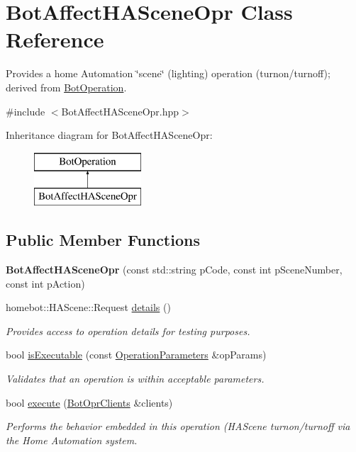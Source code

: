 \hypertarget{classBotAffectHASceneOpr}{\section{Bot\-Affect\-H\-A\-Scene\-Opr Class Reference}
\label{classBotAffectHASceneOpr}
}


Provides a home Automation \char`\"{}scene\char`\"{} (lighting) operation (turnon/turnoff); derived from \hyperlink{classBotOperation}{Bot\-Operation}.  




{\ttfamily \#include $<$Bot\-Affect\-H\-A\-Scene\-Opr.\-hpp$>$}

Inheritance diagram for Bot\-Affect\-H\-A\-Scene\-Opr\-:\begin{figure}[H]
\begin{center}
\leavevmode
\includegraphics[height=2.000000cm]{classBotAffectHASceneOpr}
\end{center}
\end{figure}
\subsection*{Public Member Functions}
\begin{DoxyCompactItemize}
\item 
\hypertarget{classBotAffectHASceneOpr_a7b924f64c28de823aae0591ac9b0d6ff}{{\bfseries Bot\-Affect\-H\-A\-Scene\-Opr} (const std\-::string p\-Code, const int p\-Scene\-Number, const int p\-Action)}\label{classBotAffectHASceneOpr_a7b924f64c28de823aae0591ac9b0d6ff}

\item 
homebot\-::\-H\-A\-Scene\-::\-Request \hyperlink{classBotAffectHASceneOpr_a78d554b4969e6d1f64cd5b812662153b}{details} ()
\begin{DoxyCompactList}\small\item\em Provides access to operation details for testing purposes. \end{DoxyCompactList}\item 
bool \hyperlink{classBotAffectHASceneOpr_ada2804cb3287adacbfe0c1d5015842c8}{is\-Executable} (const \hyperlink{classOperationParameters}{Operation\-Parameters} \&op\-Params)
\begin{DoxyCompactList}\small\item\em Validates that an operation is within acceptable parameters. \end{DoxyCompactList}\item 
bool \hyperlink{classBotAffectHASceneOpr_a1ea965477504ea6a7e3d7c89ced15b3b}{execute} (\hyperlink{classBotOprClients}{Bot\-Opr\-Clients} \&clients)
\begin{DoxyCompactList}\small\item\em Performs the behavior embedded in this operation (H\-A\-Scene turnon/turnoff via the Home Automation system. \end{DoxyCompactList}\end{DoxyCompactItemize}

